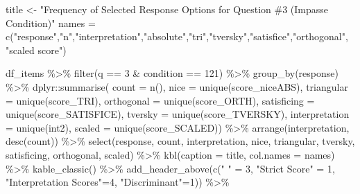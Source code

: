 \documentclass[
  letterpaper,
  DIV=11,
  numbers=noendperiod]{scrreprt}
\newenvironment{Shaded}{\begin{snugshade}}{\end{snugshade}}
\newcommand{\AttributeTok}[1]{\textcolor[rgb]{0.40,0.45,0.13}{#1}}
\newcommand{\DecValTok}[1]{\textcolor[rgb]{0.68,0.00,0.00}{#1}}
\newcommand{\FunctionTok}[1]{\textcolor[rgb]{0.28,0.35,0.67}{#1}}
\newcommand{\NormalTok}[1]{\textcolor[rgb]{0.00,0.23,0.31}{#1}}
\newcommand{\OtherTok}[1]{\textcolor[rgb]{0.00,0.23,0.31}{#1}}
\newcommand{\SpecialCharTok}[1]{\textcolor[rgb]{0.37,0.37,0.37}{#1}}
\newcommand{\StringTok}[1]{\textcolor[rgb]{0.13,0.47,0.30}{#1}}
\begin{document}
\begin{Shaded}
\begin{Highlighting}[]
\NormalTok{title }\OtherTok{\textless{}{-}} \StringTok{"Frequency of Selected Response Options for Question \#3 (Impasse Condition)"}
\NormalTok{names }\OtherTok{=} \FunctionTok{c}\NormalTok{(}\StringTok{"response"}\NormalTok{,}\StringTok{"n"}\NormalTok{,}\StringTok{"interpretation"}\NormalTok{,}\StringTok{"absolute"}\NormalTok{,}\StringTok{"tri"}\NormalTok{,}\StringTok{"tversky"}\NormalTok{,}\StringTok{"satisfice"}\NormalTok{,}\StringTok{"orthogonal"}\NormalTok{, }\StringTok{"scaled score"}\NormalTok{)}

\NormalTok{df\_items }\SpecialCharTok{\%\textgreater{}\%} \FunctionTok{filter}\NormalTok{(q }\SpecialCharTok{==} \DecValTok{3} \SpecialCharTok{\&}\NormalTok{ condition }\SpecialCharTok{==} \DecValTok{121}\NormalTok{) }\SpecialCharTok{\%\textgreater{}\%} \FunctionTok{group\_by}\NormalTok{(response) }\SpecialCharTok{\%\textgreater{}\%} 
\NormalTok{  dplyr}\SpecialCharTok{::}\FunctionTok{summarise}\NormalTok{( }\AttributeTok{count =} \FunctionTok{n}\NormalTok{(), }
                    \AttributeTok{nice =} \FunctionTok{unique}\NormalTok{(score\_niceABS),}
                    \AttributeTok{triangular =} \FunctionTok{unique}\NormalTok{(score\_TRI), }
                    \AttributeTok{orthogonal =}  \FunctionTok{unique}\NormalTok{(score\_ORTH),}
                    \AttributeTok{satisficing =}  \FunctionTok{unique}\NormalTok{(score\_SATISFICE),}
                    \AttributeTok{tversky =} \FunctionTok{unique}\NormalTok{(score\_TVERSKY),}
                    \AttributeTok{interpretation =} \FunctionTok{unique}\NormalTok{(int2),}
                    \AttributeTok{scaled =} \FunctionTok{unique}\NormalTok{(score\_SCALED)) }\SpecialCharTok{\%\textgreater{}\%} 
  \FunctionTok{arrange}\NormalTok{(interpretation, }\FunctionTok{desc}\NormalTok{(count)) }\SpecialCharTok{\%\textgreater{}\%} 
  \FunctionTok{select}\NormalTok{(response, count, interpretation, nice, }
\NormalTok{         triangular, tversky, satisficing, orthogonal, scaled) }\SpecialCharTok{\%\textgreater{}\%} 
  \FunctionTok{kbl}\NormalTok{(}\AttributeTok{caption =}\NormalTok{ title, }\AttributeTok{col.names =}\NormalTok{ names) }\SpecialCharTok{\%\textgreater{}\%}  \FunctionTok{kable\_classic}\NormalTok{() }\SpecialCharTok{\%\textgreater{}\%} 
  \FunctionTok{add\_header\_above}\NormalTok{(}\FunctionTok{c}\NormalTok{(}\StringTok{" "} \OtherTok{=} \DecValTok{3}\NormalTok{, }\StringTok{"Strict Score"} \OtherTok{=} \DecValTok{1}\NormalTok{, }\StringTok{"Interpretation Scores"}\OtherTok{=}\DecValTok{4}\NormalTok{, }\StringTok{"Discriminant"}\OtherTok{=}\DecValTok{1}\NormalTok{)) }\SpecialCharTok{\%\textgreater{}\%}

\end{Highlighting}
\end{Shaded}
\end{document}
